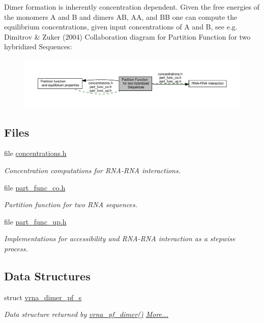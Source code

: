 Dimer formation is inherently concentration dependent. Given the free energies of the monomers A and B and dimers AB, AA, and BB one can compute the equilibrium concentrations, given input concentrations of A and B, see e.\+g. Dimitrov \& Zuker (2004) Collaboration diagram for Partition Function for two hybridized Sequences\+:
\nopagebreak
\begin{figure}[H]
\begin{center}
\leavevmode
\includegraphics[width=350pt]{group__pf__cofold}
\end{center}
\end{figure}
\subsection*{Files}
\begin{DoxyCompactItemize}
\item 
file \hyperlink{concentrations_8h}{concentrations.\+h}
\begin{DoxyCompactList}\small\item\em Concentration computations for R\+N\+A-\/\+R\+NA interactions. \end{DoxyCompactList}\item 
file \hyperlink{part__func__co_8h}{part\+\_\+func\+\_\+co.\+h}
\begin{DoxyCompactList}\small\item\em Partition function for two R\+NA sequences. \end{DoxyCompactList}\item 
file \hyperlink{part__func__up_8h}{part\+\_\+func\+\_\+up.\+h}
\begin{DoxyCompactList}\small\item\em Implementations for accessibility and R\+N\+A-\/\+R\+NA interaction as a stepwise process. \end{DoxyCompactList}\end{DoxyCompactItemize}
\subsection*{Data Structures}
\begin{DoxyCompactItemize}
\item 
struct \hyperlink{group__pf__cofold_structvrna__dimer__pf__s}{vrna\+\_\+dimer\+\_\+pf\+\_\+s}
\begin{DoxyCompactList}\small\item\em Data structure returned by \hyperlink{group__pf__cofold_ga4e5c7d06c302a7c59fc0d64dc142ca63}{vrna\+\_\+pf\+\_\+dimer()}  \hyperlink{group__pf__cofold_structvrna__dimer__pf__s}{More...}\end{DoxyCompactList}\end{DoxyCompactItemize}
